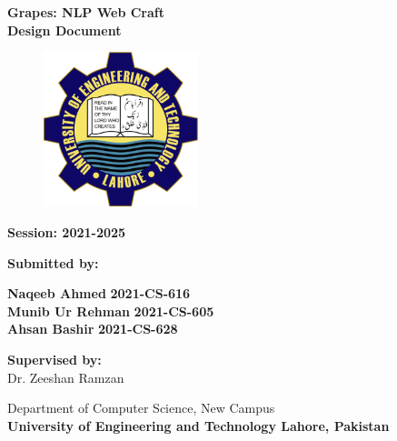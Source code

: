 \documentclass[12pt]{report}
\begin{document}
\begin{titlepage}
    \centering
    
    {\Huge \textbf{Grapes: NLP Web Craft}}\\
    \vspace{0.5cm}
    {\LARGE \textbf{Design Document}}\\
    
    \vspace{1cm}
    \begin{figure}[ht]
        \centering
        \includegraphics[width=0.4\textwidth]{Media/uet.png} %
    \end{figure}

    \vspace{1cm}
    
    {\LARGE \textbf{Session: 2021-2025}}\\
    \vspace{1.5cm}
    
    {\LARGE \textbf{Submitted by:}}\\
    \vspace{1cm}
    
    \textbf{Naqeeb Ahmed} \hspace{2cm} \textbf{2021-CS-616}\\
    \textbf{Munib Ur Rehman} \hspace{2cm} \textbf{2021-CS-605}\\
    \textbf{Ahsan Bashir} \hspace{2cm} \textbf{2021-CS-628}\\
    
    \vspace{1.5cm}
    
    {\LARGE \textbf{Supervised by:}}\\
    {\LARGE
    Dr. Zeeshan Ramzan
    }\\
    \vspace{2cm}

    {\LARGE {Department of Computer Science, New Campus}}\\
    {\LARGE \textbf{University of Engineering and Technology Lahore, Pakistan}}\\
    
    \vspace{1in} %

\end{titlepage}
\tableofcontents
\newpage
\end{document}
